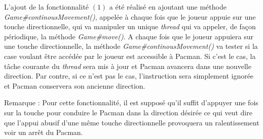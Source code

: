 \documentclass[12pt, openany]{report}
\begin{document}
L'ajout de la fonctionnalité $(1)$ a été réalisé en ajoutant une méthode \mbox{\textit{Game\#continousMovement()}}, appelée à chaque fois que le joueur appuie sur une touche directionnelle, qui va manipuler un unique \textit{thread} qui va appeler, de façon périodique, la méthode \mbox{\textit{Game\#move()}}. A chaque fois que le joueur appuiera sur une touche directionnelle, la méthode \mbox{\textit{Game\#continousMovement()}} va tester si la case voulant être accédée par le joueur est accessible à Pacman. Si c'est le cas, la tâche courante du \textit{thread} sera mis à jour et Pacman avancera dans une nouvelle direction. Par contre, si ce n'est pas le cas, l'instruction sera simplement ignorée et Pacman conservera son ancienne direction. 

Remarque : Pour cette fonctionnalité, il est supposé qu'il suffit d'appuyer une fois sur la touche pour conduire le Pacman dans la direction désirée ce qui veut dire que l'appui abusif d'une même touche directionnelle provoquera un ralentissement voir un arrêt du Pacman.
\end{document}
